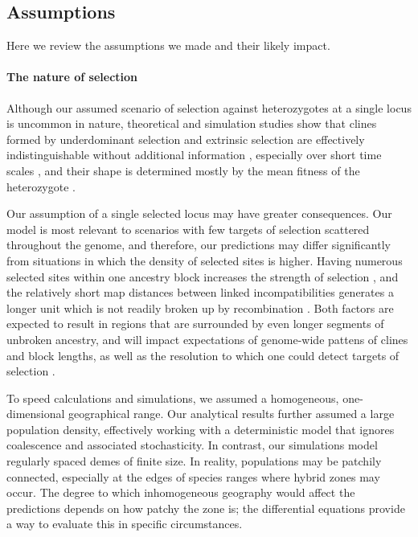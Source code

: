 \documentclass[11pt,letterpaper]{article}
\begin{document}
\subsection*{Assumptions}

Here we review the assumptions we made and their likely impact.

\paragraph{The nature of selection}
Although our assumed scenario of selection against heterozygotes at a single locus is uncommon in nature, 
theoretical and simulation studies show that clines formed by underdominant selection and extrinsic selection 
are effectively indistinguishable without additional information \citep{may1975gene,Barton1993,Kruuk1999}, 
especially over short time scales \citep{Barton1979a},
and their shape is determined mostly by the mean fitness of the heterozygote \citep{Slatkin1973}. 

Our assumption of a single selected locus may have greater consequences. Our model is most relevant to scenarios with few targets of selection scattered throughout the genome, and therefore, our predictions may differ significantly from situations in which the density of selected sites is higher. 
Having numerous selected sites within one ancestry block increases the strength of selection \citep{barton1986barrier}, 
and the relatively short map distances between linked incompatibilities generates a longer unit which is not readily broken up by recombination \citep{barton1986effects}. 
Both factors are expected to result in regions that are surrounded by even longer segments of unbroken ancestry, 
and will impact expectations of genome-wide pattens of clines and block lengths, as well as the resolution to which one could detect targets of selection \citep{Slatkin1975b,Barton1983}. 

To speed calculations and simulations, we assumed a homogeneous, one-dimensional geographical range.
Our analytical results further assumed a large population density, 
effectively working with a deterministic model that ignores coalescence and associated stochasticity.
In contrast, our simulations model regularly spaced demes of finite size.
In reality, populations may be patchily connected, especially at the edges of species ranges where hybrid zones may occur. 
The degree to which inhomogeneous geography would affect the predictions depends on how patchy the zone is;
the differential equations provide a way to evaluate this in specific circumstances.
\end{document}
